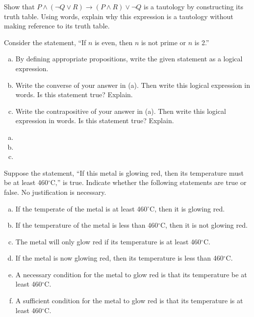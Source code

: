 \documentclass[11pt,letterpaper]{article}
\begin{document}

 Show that $P \wedge (\neg Q \vee R) \to (P \wedge R) \vee \neg Q$ is a tautology by constructing its truth table. Using words, explain why this expression is a tautology without making reference to its truth table. \pspace

\sol 



\newpage



 Consider the statement, ``If $n$ is even, then $n$ is not prime or $n$ is 2.''
	\begin{enumerate}[(a)]
	\item By defining appropriate propositions, write the given statement as a logical expression.
	\item Write the converse of your answer in (a). Then write this logical expression in words. Is this statement true? Explain.
	\item Write the contrapositive of your answer in (a). Then write this logical expression in words. Is this statement true? Explain. 
	\end{enumerate} \pspace

\sol
\begin{enumerate}[(a)]
\item 
\item 
\item 
\end{enumerate}



\newpage



 Suppose the statement, ``If this metal is glowing red, then its temperature must be at least 460$^\circ$C,'' is true. Indicate whether the following statements are true or false. No justification is necessary.
	\begin{enumerate}[(a)]
	\item If the temperate of the metal is at least 460$^\circ$C, then it is glowing red.
	\item If the temperature of the metal is less than 460$^\circ$C, then it is not glowing red.
	\item The metal will only glow red if its temperature is at least 460$^\circ$C.
	\item If the metal is now glowing red, then its temperature is less than 460$^\circ$C.
	\item A necessary condition for the metal to glow red is that its temperature be at least 460$^\circ$C.
	\item A sufficient condition for the metal to glow red is that its temperature is at least 460$^\circ$C.
	\end{enumerate} \pspace
\end{document}

